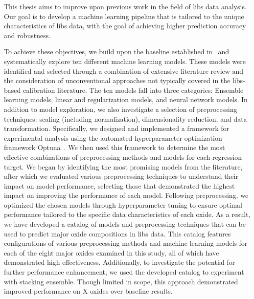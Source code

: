 This thesis aims to improve upon previous work in the field of \gls{libs} data analysis.
Our goal is to develop a machine learning pipeline that is tailored to the unique characteristics of \gls{libs} data, with the goal of achieving higher prediction accuracy and robustness.

To achieve these objectives, we build upon the baseline established in~\cite{p9_paper} and systematically explore ten different machine learning models.
These models were identified and selected through a combination of extensive literature review and the consideration of unconventional approaches not typically covered in the \gls{libs}-based calibration literature.
The ten models fall into three categories: Ensemble learning models, linear and regularization models, and neural network models.
In addition to model exploration, we also investigate a selection of preprocessing techniques: scaling (including normalization), dimensionality reduction, and data transformation.
Specifically, we designed and implemented a framework for experimental analysis using the automated hyperparameter optimization framework Optuna~\cite{optuna_2019}.
We then used this framework to determine the most effective combinations of preprocessing methods and models for each regression target.
We began by identifying the most promising models from the literature, after which we evaluated various preprocessing techniques to understand their impact on model performance, selecting those that demonstrated the highest impact on improving the performance of each model.
Following preprocessing, we optimized the chosen models through hyperparameter tuning to ensure optimal performance tailored to the specific data characteristics of each oxide.
As a result, we have developed a catalog of models and preprocessing techniques that can be used to predict major oxide compositions in \gls{libs} data.
This catalog features configurations of various preprocessing methods and machine learning models for each of the eight major oxides examined in this study, all of which have demonstrated high effectiveness.
Additionally, to investigate the potential for further performance enhancement, we used the developed catalog to experiment with stacking ensemble.
Though limited in scope, this approach demonstrated improved performance on {X} oxides over baseline results.

